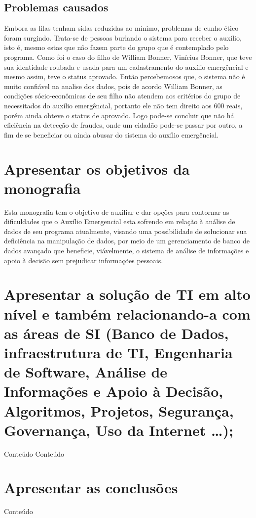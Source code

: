 \documentclass[12pt]{article}
\begin{document}
\subsection{Problemas causados}
	Embora as filas tenham sidas reduzidas ao mínimo, problemas de cunho ético foram surgindo. Trata-se de pessoas burlando o sistema para receber o auxílio, isto é, mesmo estas que não fazem parte do grupo que é contemplado pelo programa. Como foi o caso do filho de William Bonner, Vinícius Bonner, que teve sua identidade roubada e usada para um cadastramento do auxílio emergêncial e mesmo assim, teve o status aprovado.
\linebreak
\linebreak
	Então percebemosos que, o sistema não é muito confiável na analise dos dados, pois de acordo William Bonner, as condições sócio-econômicas de seu filho não atendem aos critérios do grupo de necessitados do auxílio emergêncial, portanto ele não tem direito aos 600 reais, porém ainda obteve o status de aprovado. Logo pode-se concluir que não há eficiência na detecção de fraudes, onde um cidadão pode-se passar por outro, a fim de se beneficiar ou ainda abusar do sistema do auxílio emergêncial. 
\section{Apresentar os objetivos da monografia}
	Esta monografia tem o objetivo de auxiliar e dar opções para contornar as dificuldades que o Auxílio Emergencial esta sofrendo em relação à análise de dados de seu programa atualmente, visando uma possibilidade de solucionar sua deficiência na manipulação de dados, por meio de um gerenciamento de banco de dados avançado que beneficie, viávelmente, o sistema de análise de informações e apoio à decisão sem prejudicar informações pessoais.

\section{Apresentar a solução de TI em alto nível e também relacionando-a com as áreas de SI (Banco de Dados, infraestrutura de TI, Engenharia de Software, Análise de Informações e Apoio à Decisão, Algoritmos, Projetos, Segurança, Governança, Uso da Internet …);}
Conteúdo
\linebreak
\linebreak
Conteúdo

\section{Apresentar as conclusões}
Conteúdo
\end{document}

